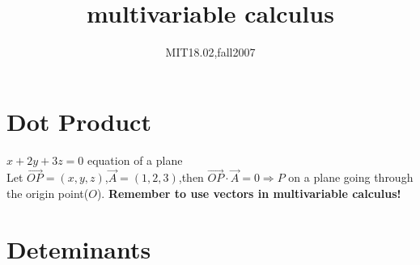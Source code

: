 \documentclass{article}
\title{multivariable calculus}
\author{MIT18.02,fall2007}
\date{}
\begin{document}
\maketitle
\section{Dot Product}
$x+2y+3z=0$ equation of a plane\\
Let $\overrightarrow{OP}=(x,y,z)$,$\overrightarrow{A}=(1,2,3)$,then $\overrightarrow{OP}\cdot\overrightarrow{A}=0\Rightarrow P$
on a plane going through the origin point($O$).
\textbf{Remember to use vectors in multivariable calculus!}
\section{Deteminants}
\end{document}
